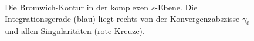 \begin{figure}
%        
%        
%
\caption{Die Bromwich-Kontur in der komplexen $s$-Ebene. Die Integrationsgerade (blau) liegt rechts von der Konvergenzabszisse $\gamma_0$ und allen Singularitäten (rote Kreuze).}
\label{laplace:fig:bromwich}
\end{figure}
